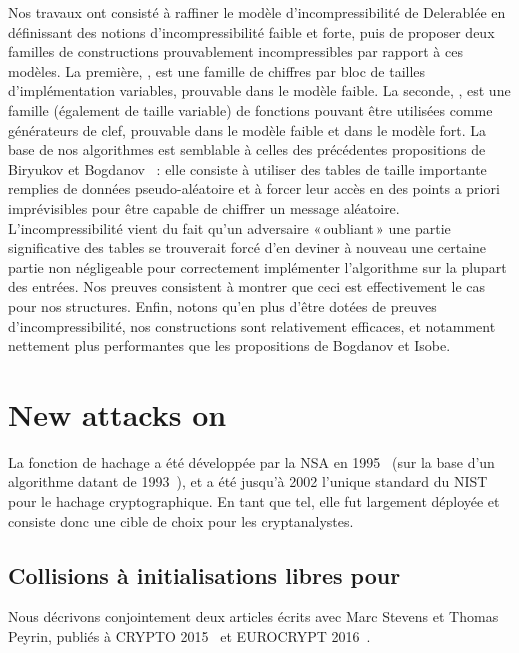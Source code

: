 Nos travaux ont consisté à raffiner le modèle d'incompressibilité de Delerablée \etal en définissant des notions d'incompressibilité faible et forte, puis de proposer deux familles de constructions
prouvablement incompressibles par rapport à ces modèles. La première, \pc, est une famille de chiffres par bloc de tailles d'implémentation variables, prouvable dans le modèle
faible. La seconde, \cdb, est une famille (également de taille variable) de fonctions
pouvant être utilisées comme générateurs de clef, prouvable dans le modèle faible et dans le modèle fort. La base de nos algorithmes est semblable à celles des précédentes propositions de Biryukov \etal
et Bogdanov \etal~: elle consiste à utiliser des tables de taille importante remplies de données pseudo-aléatoire et à forcer leur accès en des points a priori imprévisibles pour être capable de
chiffrer un message aléatoire. L'incompressibilité vient du fait qu'un adversaire «\,oubliant\,» une partie significative des tables se trouverait forcé d'en deviner à nouveau une certaine partie
non négligeable
pour correctement implémenter l'algorithme sur la plupart des entrées. Nos preuves consistent à montrer que ceci est effectivement le cas pour nos structures. Enfin, notons qu'en plus d'être
dotées de preuves d'incompressibilité, nos constructions sont relativement efficaces, et notamment nettement plus performantes que les propositions de Bogdanov et Isobe.

\section[Nouvelles attaques sur la fonction de hachage \shaone]{New attacks on \shaone}

La fonction de hachage \shaone a été développée par la NSA en 1995~\cite{Nist-SHA1} (sur la base d'un algorithme datant de 1993~\cite{Nist-SHA0}), et a été jusqu'à 2002 l'unique standard du NIST pour
le hachage cryptographique. En tant que tel, elle fut largement déployée et consiste donc une cible de choix pour les cryptanalystes.

\subsection{Collisions à initialisations libres pour \shaone \cite{DBLP:conf/crypto/KarpmanPS15,DBLP:conf/eurocrypt/StevensKP16}}

Nous décrivons conjointement deux articles écrits avec Marc Stevens et Thomas Peyrin, publiés à CRYPTO 2015~\cite{DBLP:conf/crypto/KarpmanPS15} et EUROCRYPT 2016~\cite{DBLP:conf/eurocrypt/StevensKP16}.

